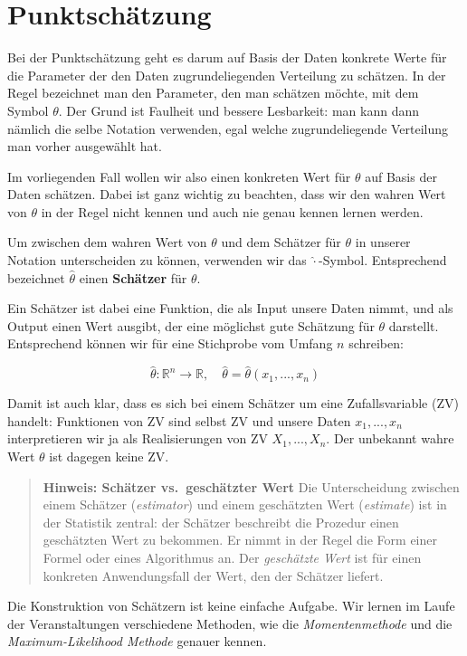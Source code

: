 \documentclass[]{book}
\begin{document}
\section{Punktschätzung}\label{punktschatzung}

Bei der Punktschätzung geht es darum auf Basis der Daten konkrete Werte
für die Parameter der den Daten zugrundeliegenden Verteilung zu
schätzen. In der Regel bezeichnet man den Parameter, den man schätzen
möchte, mit dem Symbol \(\theta\). Der Grund ist Faulheit und bessere
Lesbarkeit: man kann dann nämlich die selbe Notation verwenden, egal
welche zugrundeliegende Verteilung man vorher ausgewählt hat.

Im vorliegenden Fall wollen wir also einen konkreten Wert für \(\theta\)
auf Basis der Daten schätzen. Dabei ist ganz wichtig zu beachten, dass
wir den wahren Wert von \(\theta\) in der Regel nicht kennen und auch
nie genau kennen lernen werden.

Um zwischen dem wahren Wert von \(\theta\) und dem Schätzer für
\(\theta\) in unserer Notation unterscheiden zu können, verwenden wir
das \(\hat{\cdot}\)-Symbol. Entsprechend bezeichnet \(\hat{\theta}\)
einen \textbf{Schätzer} für \(\theta\).

Ein Schätzer ist dabei eine Funktion, die als Input unsere Daten nimmt,
und als Output einen Wert ausgibt, der eine möglichst gute Schätzung für
\(\theta\) darstellt. Entsprechend können wir für eine Stichprobe vom
Umfang \(n\) schreiben:

\[\hat{\theta}: \mathbb{R}^n \rightarrow \mathbb{R}, \quad \hat{\theta}=\hat{\theta}(x_1,...,x_n)\]

Damit ist auch klar, dass es sich bei einem Schätzer um eine
Zufallsvariable (ZV) handelt: Funktionen von ZV sind selbst ZV und
unsere Daten \(x_1,...,x_n\) interpretieren wir ja als Realisierungen
von ZV \(X_1,...,X_n\). Der unbekannt wahre Wert \(\theta\) ist dagegen
keine ZV.

\begin{quote}
\textbf{Hinweis: Schätzer vs.~geschätzter Wert} Die Unterscheidung
zwischen einem Schätzer (\emph{estimator}) und einem geschätzten Wert
(\emph{estimate}) ist in der Statistik zentral: der Schätzer beschreibt
die Prozedur einen geschätzten Wert zu bekommen. Er nimmt in der Regel
die Form einer Formel oder eines Algorithmus an. Der \emph{geschätzte
Wert} ist für einen konkreten Anwendungsfall der Wert, den der Schätzer
liefert.
\end{quote}

Die Konstruktion von Schätzern ist keine einfache Aufgabe. Wir lernen im
Laufe der Veranstaltungen verschiedene Methoden, wie die
\emph{Momentenmethode} und die \emph{Maximum-Likelihood Methode} genauer
kennen.
\end{document}
